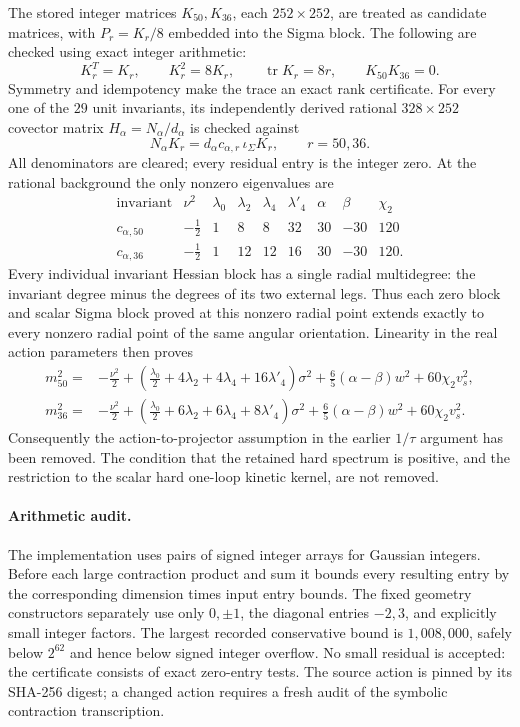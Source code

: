 The stored integer matrices $K_{50},K_{36}$, each $252\times252$,
are treated as candidate matrices, with $P_r=K_r/8$ embedded into the
Sigma block.  The following are checked using exact integer arithmetic:
\begin{equation}
 K_r^T=K_r,\qquad K_r^2=8K_r,\qquad
 \operatorname{tr}K_r=8r,\qquad K_{50}K_{36}=0.
\end{equation}
Symmetry and idempotency make the trace an exact rank certificate.
For every one of the $29$ unit invariants, its independently derived
rational $328\times252$ covector matrix $H_\alpha=N_\alpha/d_\alpha$
is checked against
\begin{equation}
 N_\alpha K_r=d_\alpha c_{\alpha,r}\,\iota_\Sigma K_r,
 \qquad r=50,36.
\end{equation}
All denominators are cleared; every residual entry is the integer zero.
At the rational background the only nonzero eigenvalues are
\begin{equation}
\begin{array}{c|rrrrrrrr}
 \text{invariant}&\nu^2&\lambda_0&\lambda_2&\lambda_4&\lambda'_4&\alpha&\beta&\chi_2\\ \hline
 c_{\alpha,50}&-\frac12&1&8&8&32&30&-30&120\\
 c_{\alpha,36}&-\frac12&1&12&12&16&30&-30&120.
\end{array}
\end{equation}
Every individual invariant Hessian block has a single radial multidegree:
the invariant degree minus the degrees of its two external legs.
Thus each zero block and scalar Sigma block proved at this nonzero radial
point extends exactly to every nonzero radial point of the same angular
orientation.  Linearity in the real action parameters then proves
\begin{align}
 m_{50}^2={}&-\frac{\nu^2}{2}
 +\left(\frac{\lambda_0}{2}+4\lambda_2+4\lambda_4+16\lambda'_4\right)\sigma^2
 +\frac65(\alpha-\beta)w^2+60\chi_2v_s^2,\\
 m_{36}^2={}&-\frac{\nu^2}{2}
 +\left(\frac{\lambda_0}{2}+6\lambda_2+6\lambda_4+8\lambda'_4\right)\sigma^2
 +\frac65(\alpha-\beta)w^2+60\chi_2v_s^2.
\end{align}
Consequently the action-to-projector assumption in the earlier
$1/\tau$ argument has been removed.  The condition that the retained hard
spectrum is positive, and the restriction to the scalar hard one-loop
kinetic kernel, are not removed.

\paragraph{Arithmetic audit.}
The implementation uses pairs of signed integer arrays for Gaussian
integers. Before each large contraction product and sum it bounds every
resulting entry by the corresponding dimension times input entry bounds.
The fixed geometry constructors separately use only $0,\pm1$, the
diagonal entries $-2,3$, and explicitly small integer factors.
The largest recorded conservative bound is $1{,}008{,}000$, safely below
$2^{62}$ and hence below signed integer overflow.  No small residual is
accepted: the certificate consists of exact zero-entry tests.  The source
action is pinned by its SHA-256 digest; a changed action requires a fresh
audit of the symbolic contraction transcription.
